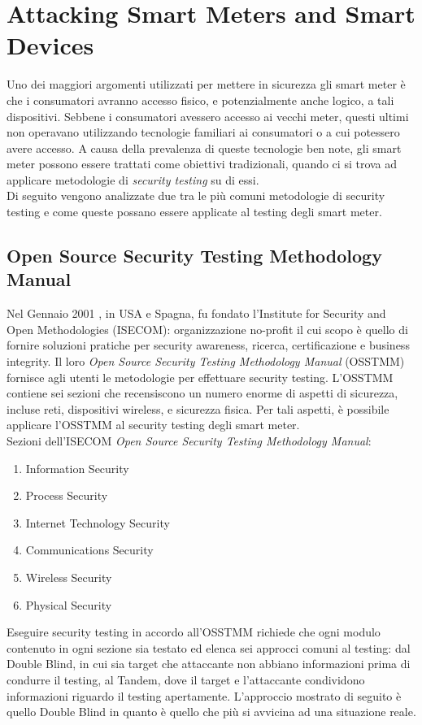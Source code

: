 \section{Attacking Smart Meters and Smart Devices}
Uno dei maggiori argomenti utilizzati per mettere in sicurezza gli smart meter è che i consumatori avranno accesso fisico, e potenzialmente anche logico, a tali dispositivi. Sebbene i consumatori avessero accesso ai vecchi meter, questi ultimi non operavano utilizzando tecnologie familiari ai consumatori o a cui potessero avere accesso. A causa della prevalenza di queste tecnologie ben note, gli smart meter possono essere trattati come obiettivi tradizionali, quando ci si trova ad applicare metodologie di \emph{security testing} su di essi.\\
Di seguito vengono analizzate due tra le più comuni metodologie di security testing e come queste possano essere applicate al testing degli smart meter.

\subsection{Open Source Security Testing Methodology Manual}
Nel Gennaio 2001 , in USA e Spagna, fu fondato l'Institute for Security and Open Methodologies (ISECOM): organizzazione no-profit il cui scopo è quello di fornire soluzioni pratiche per security awareness, ricerca, certificazione e business integrity. Il loro \emph{Open Source Security Testing Methodology Manual} (OSSTMM) fornisce agli utenti le metodologie per effettuare security testing. L'OSSTMM contiene sei sezioni che recensiscono un numero enorme di aspetti di sicurezza, incluse reti, dispositivi wireless, e sicurezza fisica. Per tali aspetti, è possibile applicare l'OSSTMM al security testing degli smart meter.\\
Sezioni dell'ISECOM \emph{Open Source Security Testing Methodology Manual}:
\begin{enumerate}
	\item Information Security
	\item Process Security
	\item Internet Technology Security
	\item Communications Security
	\item Wireless Security
	\item Physical Security
\end{enumerate}
Eseguire security testing in accordo all'OSSTMM richiede che ogni modulo contenuto in ogni sezione sia testato ed elenca sei approcci comuni al testing: dal Double Blind, in cui sia target che attaccante non abbiano informazioni prima di condurre il testing, al Tandem, dove il target e l'attaccante condividono informazioni riguardo il testing apertamente. L'approccio mostrato di seguito è quello Double Blind in quanto è quello che più si avvicina ad una situazione reale.
